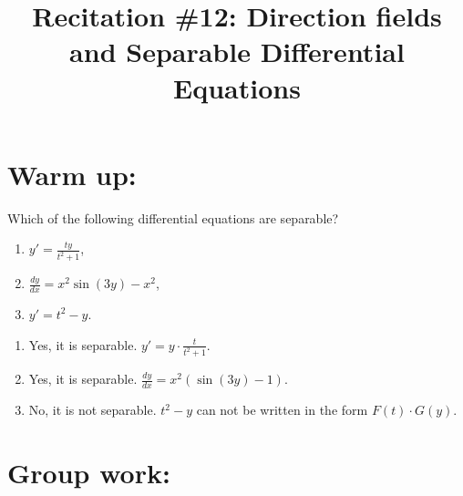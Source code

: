 \documentclass[noinstructornotes]{ximera}
\title{Recitation \#12: Direction fields and Separable Differential Equations}
\begin{document}
\begin{abstract}		\end{abstract}
\maketitle




\section{Warm up:}
	Which of the following differential equations are separable?
	\begin{enumerate}
	\item $y' = \frac{ty}{t^2+1}$,
	\item $\frac{dy}{dx} =x^2 \sin (3y) -x^2$,
	\item $y' = t^2 - y$.
	\end{enumerate}

	\begin{freeResponse}
	\begin{enumerate}
	\item Yes, it is separable. $y' = y \cdot \frac{t}{t^2+1}$.
	\item Yes, it is separable. $\frac{dy}{dx} = x^2 \left( \sin(3y)-1 \right)$.
	\item No, it is not separable. $t^2-y$ can not be written in the form $F(t) \cdot G(y)$. 
	\end{enumerate}
	\end{freeResponse}
	
\begin{instructorNotes}

\end{instructorNotes}








\section{Group work:}
\end{document}
